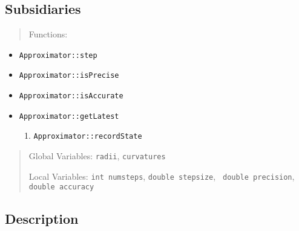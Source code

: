 \subsection*{Subsidiaries}

\begin{quotation}
Functions:
\end{quotation}

\begin{itemize}
\item \texttt{Approximator::step}

\item \texttt{Approximator::isPrecise}

\item \texttt{Approximator::isAccurate}

\item \texttt{Approximator::getLatest}

\begin{enumerate}
\item \texttt{Approximator::recordState}
\end{enumerate}
\end{itemize}

\begin{quotation}
Global Variables: \texttt{radii}, \texttt{curvatures}

Local Variables: \texttt{int numsteps}, \texttt{double stepsize}, \texttt{%
double precision}, \texttt{double accuracy}
\end{quotation}

\subsection*{Description}

